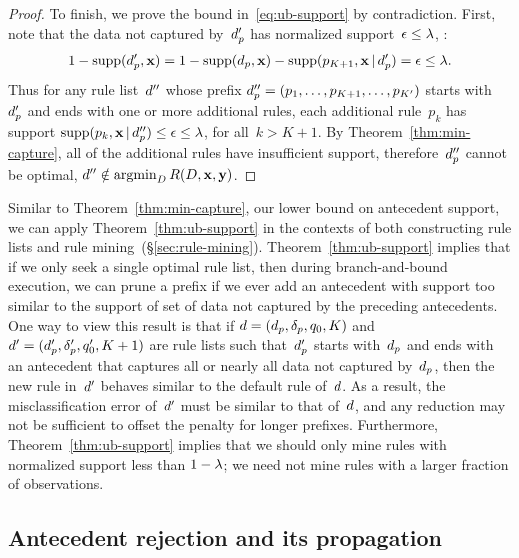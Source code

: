 \begin{proof}
To finish, we prove the bound in~\eqref{eq:ub-support} by contradiction.
%
First, note that the data not captured by~$d_p'$
has normalized support~${\epsilon \le {\lambda}}$, \ie:
\begin{align}
1 - \Supp(\Prefix', \x) = 1 - \Supp(\Prefix, \x) - \Supp(p_{K+1}, \x \given \Prefix') = \epsilon \le \Reg.
\end{align}
Thus for any rule list~${d}''$ whose prefix
$d_p'' = (p_1, \dots, p_{K+1}, \dots, p_{K'})$ starts
with~$d_p'$ and ends with one or more additional rules,
each additional rule~$p_k$ has support
${\textnormal{supp}(p_k, \mathbf{x} \,|\, d_p'') \le \epsilon \le {\lambda}}$,
for all~${k > K+1}$.
%
By Theorem~\ref{thm:min-capture},
all of the additional rules have insufficient support,
therefore~$d_p''$ cannot be optimal,
\ie ${{d}'' \notin \operatorname*{argmin}_{{D}} R({D}, \mathbf{x}, \mathbf{y})}$.
\end{proof}

Similar to Theorem~\ref{thm:min-capture}, our lower bound on
antecedent support, we can apply Theorem~\ref{thm:ub-support}
in the contexts of both constructing rule lists and
rule mining~(\S\ref{sec:rule-mining}).
%
Theorem~\ref{thm:ub-support} implies that if we only seek a single
optimal rule list, then during branch-and-bound execution,
we can prune a prefix if we ever add an antecedent with support
too similar to the support of set of data not captured by the
preceding antecedents.
%
One way to view this result is that if
${{d} = (d_p, \delta_p, q_0, K)}$
and ${{d}' = (d_p', \delta_p', q_0', K + 1)}$
are rule lists such that~$d_p'$ starts with~$d_p$
and ends with an antecedent that captures all or nearly all
data not captured by~$d_p$, then the new rule in~${d}'$
behaves similar to the default rule of~${d}$.
%
As a result, the misclassification error of~${d}'$ must be
similar to that of~${d}$, and any reduction may not be
sufficient to offset the penalty for longer prefixes.
%
Furthermore, Theorem~\ref{thm:ub-support} implies that we should
only mine rules with normalized support less than ${1 - {\lambda}}$;
we need not mine rules with a larger fraction of observations.

\subsection{Antecedent rejection and its propagation}

